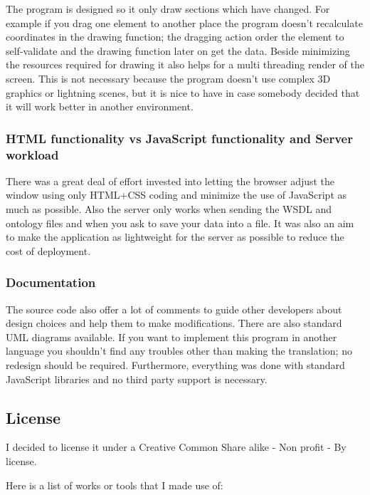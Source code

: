 \documentclass[a4paper,10pt]{article}
\begin{document}
    The program is designed so it only draw sections which have changed. For example if you drag one element to another place the program doesn't recalculate coordinates in the drawing function; the dragging action order the element to self-validate and the drawing function later on get the data. Beside minimizing the resources required for drawing it also helps for a multi threading render of the screen. This is not necessary because the program doesn't use complex 3D graphics or lightning scenes, but it is nice to have in case somebody decided that it will work better in another environment.

    \subsubsection{HTML functionality vs JavaScript functionality and Server workload}

    There was a great deal of effort invested into letting the browser adjust the window using only HTML+CSS coding and minimize the use of JavaScript as much as possible. Also the server only works when sending the WSDL and ontology files and when you ask to save your data into a file. It was also an aim to make the application as lightweight for the server as possible to reduce the cost of deployment.

    \subsubsection{Documentation}

    The source code also offer a lot of comments to guide other developers about design choices and help them to make modifications. There are also standard UML diagrams available. If you want to implement this program in another language you shouldn't find any troubles other than making the translation; no redesign should be required. Furthermore, everything was done with standard JavaScript libraries and no third party support is necessary.



  \subsection{License}

  I decided to license it under a Creative Common Share alike - Non profit - By  license. \cite{creative}

  Here is a list of works or tools that I made use of:\vspace{3 mm}
\end{document}
